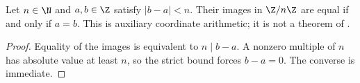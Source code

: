 \begin{lemma}%
    \label{thm:peps_zmod_small_difference}
    \leanok
    Let $n\in\N$ and $a,b\in\Z$ satisfy $|b-a|<n$.
    Their images in $\Z/n\Z$ are equal if and only if $a=b$.
    This is auxiliary coordinate arithmetic; it is not a theorem of
    \cite{Schuch2010PEPS}.
\end{lemma}

\begin{proof}\leanok
    Equality of the images is equivalent to $n\mid b-a$.
    A nonzero multiple of $n$ has absolute value at least $n$,
    so the strict bound forces $b-a=0$. The converse is immediate.
\end{proof}
